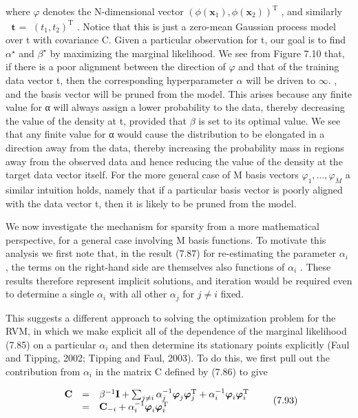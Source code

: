 \documentclass[
  10
]{article}
\begin{document}
where \(\varphi\) denotes the N-dimensional vector
\(( \phi ( \mathbf { x } _ { 1 } ) , \phi ( \mathbf { x } _ { 2 } ) ) ^ { \mathrm { T } }\)
, and similarly \({ \textbf { t } } =\)
\(( t _ { 1 } , t _ { 2 } ) ^ { \dot { \mathrm { T } } }\) . Notice that
this is just a zero-mean Gaussian process model over t with covariance
C. Given a particular observation for t, our goal is to find
\(\alpha ^ { \star }\) and \(\beta ^ { \star }\) by maximizing the
marginal likelihood. We see from Figure 7.10 that, if there is a poor
alignment between the direction of \(\varphi\) and that of the training
data vector t, then the corresponding hyperparameter \(\alpha\) will be
driven to \(\infty .\) , and the basis vector will be pruned from the
model. This arises because any finite value for α will always assign a
lower probability to the data, thereby decreasing the value of the
density at t, provided that \(\beta\) is set to its optimal value. We
see that any finite value for α would cause the distribution to be
elongated in a direction away from the data, thereby increasing the
probability mass in regions away from the observed data and hence
reducing the value of the density at the target data vector itself. For
the more general case of M basis vectors
\(\varphi _ { 1 } , \ldots , \varphi _ { M }\) a similar intuition
holds, namely that if a particular basis vector is poorly aligned with
the data vector t, then it is likely to be pruned from the model.

We now investigate the mechanism for sparsity from a more mathematical
perspective, for a general case involving M basis functions. To motivate
this analysis we first note that, in the result (7.87) for re-estimating
the parameter \(\alpha _ { i }\) , the terms on the right-hand side are
themselves also functions of \(\alpha _ { i }\) . These results
therefore represent implicit solutions, and iteration would be required
even to determine a single \(\alpha _ { i }\) with all other
\(\alpha _ { j }\) for \(j \neq i\) fixed.

This suggests a different approach to solving the optimization problem
for the RVM, in which we make explicit all of the dependence of the
marginal likelihood (7.85) on a particular \(\alpha _ { i }\) and then
determine its stationary points explicitly (Faul and Tipping, 2002;
Tipping and Faul, 2003). To do this, we first pull out the contribution
from \(\alpha _ { i }\) in the matrix C defined by (7.86) to give

\[
\begin{array}{r c l} \mathbf {C} & = & \beta^ {- 1} \mathbf {I} + \sum_ {j \neq i} \alpha_ {j} ^ {- 1} \boldsymbol {\varphi} _ {j} \boldsymbol {\varphi} _ {j} ^ {\mathrm{T}} + \alpha_ {i} ^ {- 1} \boldsymbol {\varphi} _ {i} \boldsymbol {\varphi} _ {i} ^ {\mathrm{T}} \\ & = & \mathbf {C} _ {- i} + \alpha_ {i} ^ {- 1} \boldsymbol {\varphi} _ {i} \boldsymbol {\varphi} _ {i} ^ {\mathrm{T}} \end{array}\tag{7.93}
\]
\end{document}
